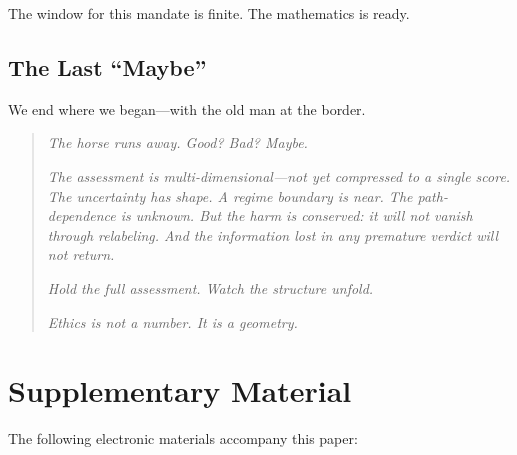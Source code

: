 \documentclass[12pt,letterpaper]{article}
\theoremstyle{definition}
\theoremstyle{remark}
\begin{document}
The window for this mandate is finite. The mathematics is ready.

\subsection{The Last ``Maybe''}

We end where we began---with the old man at the border.

\begin{quote}
\emph{The horse runs away. Good? Bad? Maybe.}

\emph{The assessment is multi-dimensional---not yet compressed to a single score. The uncertainty has shape. A regime boundary is near. The path-dependence is unknown. But the harm is conserved: it will not vanish through relabeling. And the information lost in any premature verdict will not return.}

\emph{Hold the full assessment. Watch the structure unfold.}

\emph{Ethics is not a number. It is a geometry.}
\end{quote}


\section*{Supplementary Material}

The following electronic materials accompany this paper:
\end{document}
